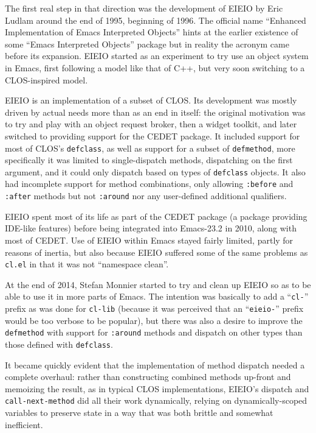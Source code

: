 \documentclass[format=acmsmall, review=false, screen=true]{acmart}
\begin{document}
The first real step in that direction was the development of EIEIO by Eric
Ludlam around the end of 1995, beginning of 1996.  The official name ``Enhanced
Implementation of Emacs Interpreted Objects'' hints at the earlier existence
of some ``Emacs Interpreted Objects'' package but in reality the acronym
came before its expansion.  EIEIO started as an experiment to try use
an object system in Emacs, first following a model like that of C++, but
very soon switching to a CLOS-inspired model.

EIEIO is an implementation of a subset of CLOS.  Its development was mostly
driven by actual needs more than as an end in itself: the original
motivation was to try and play with an object request broker, then a widget
toolkit, and later switched to providing support for the CEDET package.
It included support for most of CLOS's \texttt{defclass}, as well as support
for a subset of \texttt{defmethod}, more specifically it was limited to
single-dispatch methods, dispatching on the first argument, and it could
only dispatch based on types of \texttt{defclass} objects.  It also had
incomplete support for method combinations, only allowing \texttt{:before}
and \texttt{:after} methods but not \texttt{:around} nor any user-defined
additional qualifiers.

EIEIO spent most of its life as part of the CEDET package (a package
providing IDE-like features) before being integrated into Emacs-23.2 in
2010, along with most of CEDET.  Use of EIEIO within Emacs stayed fairly
limited, partly for reasons of inertia, but also because EIEIO suffered some
of the same problems as \texttt{cl.el} in that it was not
``namespace clean''.

At the end of 2014, Stefan Monnier started to try and clean up EIEIO so as
to be able to use it in more parts of Emacs.  The intention was basically to
add a ``\texttt{cl-}'' prefix as was done for \texttt{cl-lib} (because it
was perceived that an ``\texttt{eieio-}'' prefix would be too verbose to be
popular), but there was also a desire to improve the \texttt{defmethod} with
support for \texttt{:around} methods and dispatch on other types than those
defined with \texttt{defclass}.

It became quickly evident that the implementation of method dispatch
needed a complete overhaul: rather than constructing combined methods
up-front and memoizing the result, as in typical CLOS implementations,
EIEIO's dispatch and \texttt{call-next-method} did all their work
dynamically, relying on dynamically-scoped variables to preserve state in
a way that was both brittle and somewhat inefficient.
\end{document}

